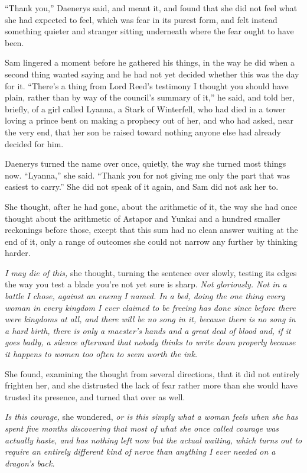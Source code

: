 “Thank you,” Daenerys said, and meant it, and found that she did not feel what she had expected to feel, which was fear in its purest form, and felt instead something quieter and stranger sitting underneath where the fear ought to have been.

Sam lingered a moment before he gathered his things, in the way he did when a second thing wanted saying and he had not yet decided whether this was the day for it. “There’s a thing from Lord Reed’s testimony I thought you should have plain, rather than by way of the council’s summary of it,” he said, and told her, briefly, of a girl called Lyanna, a Stark of Winterfell, who had died in a tower loving a prince bent on making a prophecy out of her, and who had asked, near the very end, that her son be raised toward nothing anyone else had already decided for him.

Daenerys turned the name over once, quietly, the way she turned most things now. “Lyanna,” she said. “Thank you for not giving me only the part that was easiest to carry.” She did not speak of it again, and Sam did not ask her to.

\sceneBreak

She thought, after he had gone, about the arithmetic of it, the way she had once thought about the arithmetic of Astapor and Yunkai and a hundred smaller reckonings before those, except that this sum had no clean answer waiting at the end of it, only a range of outcomes she could not narrow any further by thinking harder.

\textit{I may die of this,} she thought, turning the sentence over slowly, testing its edges the way you test a blade you’re not yet sure is sharp. \textit{Not gloriously. Not in a battle I chose, against an enemy I named. In a bed, doing the one thing every woman in every kingdom I ever claimed to be freeing has done since before there were kingdoms at all, and there will be no song in it, because there is no song in a hard birth, there is only a maester’s hands and a great deal of blood and, if it goes badly, a silence afterward that nobody thinks to write down properly because it happens to women too often to seem worth the ink.}

She found, examining the thought from several directions, that it did not entirely frighten her, and she distrusted the lack of fear rather more than she would have trusted its presence, and turned that over as well.

\textit{Is this courage,} she wondered, \textit{or is this simply what a woman feels when she has spent five months discovering that most of what she once called courage was actually haste, and has nothing left now but the actual waiting, which turns out to require an entirely different kind of nerve than anything I ever needed on a dragon’s back.}

